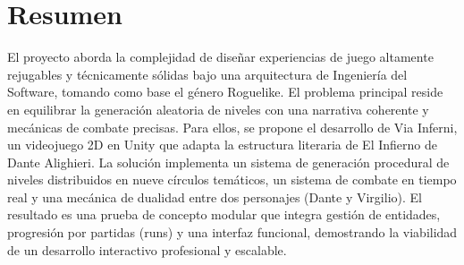 \chapter*{Resumen}
El proyecto aborda la complejidad de diseñar experiencias de 
juego altamente rejugables y técnicamente sólidas bajo una arquitectura de 
Ingeniería del Software, tomando como base el género Roguelike. El problema 
principal reside en equilibrar la generación aleatoria de niveles con una narrativa 
coherente y  mecánicas de combate precisas. Para ellos, se propone el desarrollo de 
Via Inferni, un videojuego 2D en Unity que adapta la estructura literaria de El Infierno 
de Dante Alighieri. La solución implementa un sistema de generación procedural de 
niveles distribuidos en nueve círculos temáticos, un sistema de combate en tiempo 
real y una mecánica de dualidad entre dos personajes (Dante y Virgilio). 
El resultado es una prueba de concepto modular que integra gestión de entidades, 
progresión por partidas (runs) y una interfaz funcional, demostrando la viabilidad 
de un desarrollo interactivo profesional y escalable.
